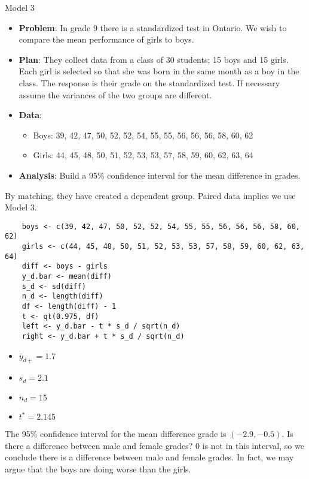 \begin{Example}{Model 3}{}
    \begin{itemize}
        \item \textbf{Problem}: In grade 9 there is a standardized test in Ontario.
              We wish to compare the mean performance of girls to boys.
        \item \textbf{Plan}: They collect data from a class of 30 students; 15 boys and 15 girls. Each girl is selected so that she was born in the
              same month as a boy in the class. The response is their grade on the standardized test. If necessary assume the
              variances of the two groups are different.
        \item \textbf{Data}:
              \begin{itemize}
                  \item Boys: 39, 42, 47, 50, 52, 52, 54, 55, 55, 56, 56, 56, 58, 60, 62
                  \item Girls: 44, 45, 48, 50, 51, 52, 53, 53, 57, 58, 59, 60, 62, 63, 64
              \end{itemize}
        \item \textbf{Analysis}: Build a 95\% confidence interval for the mean difference
              in grades.
    \end{itemize}
    By matching, they have created a dependent group. Paired data implies
    we use Model 3.
    \begin{verbatim}
    boys <- c(39, 42, 47, 50, 52, 52, 54, 55, 55, 56, 56, 56, 58, 60, 62)
    girls <- c(44, 45, 48, 50, 51, 52, 53, 53, 57, 58, 59, 60, 62, 63, 64)
    diff <- boys - girls
    y_d.bar <- mean(diff)
    s_d <- sd(diff)
    n_d <- length(diff)
    df <- length(diff) - 1 
    t <- qt(0.975, df)
    left <- y_d.bar - t * s_d / sqrt(n_d)
    right <- y_d.bar + t * s_d / sqrt(n_d)        
    \end{verbatim}
    \begin{itemize}
        \item $ \bar{y}_{d+}=1.7 $
        \item $ s_d=2.1 $
        \item $ n_d=15 $
        \item $ t^*=2.145 $
    \end{itemize}
    The 95\% confidence interval for the mean difference grade is
    $ (-2.9,-0.5) $. Is there a difference between male and female grades?
    0 is not in this interval, so we conclude there is a difference between male
    and female grades. In fact, we may argue that the boys are doing worse than the girls.
\end{Example}
